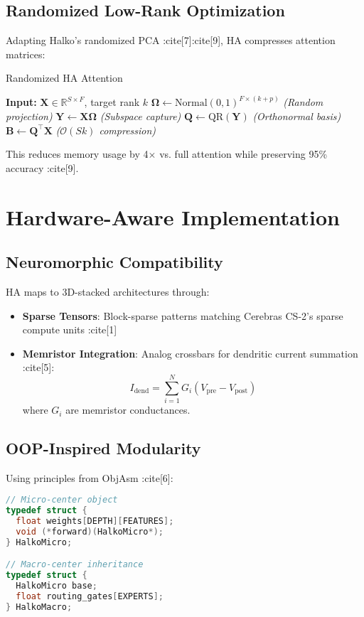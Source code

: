 \documentclass{article}
\begin{document}
\subsection{Randomized Low-Rank Optimization}
Adapting Halko's randomized PCA :cite[7]:cite[9], HA compresses attention matrices:
\begin{algorithm}[H]
\caption{Randomized HA Attention}
\begin{algorithmic}[1]
\State \textbf{Input:} $\mathbf{X} \in \mathbb{R}^{S \times F}$, target rank $k$
\State $\mathbf{\Omega} \gets \text{Normal}(0, 1)^{F \times (k+p)}$ \quad \textit{(Random projection)}
\State $\mathbf{Y} \gets \mathbf{X}\mathbf{\Omega}$ \quad \textit{(Subspace capture)}
\State $\mathbf{Q} \gets \text{QR}(\mathbf{Y})$ \quad \textit{(Orthonormal basis)}
\State $\mathbf{B} \gets \mathbf{Q}^\top \mathbf{X}$ \quad \textit{($\mathcal{O}(Sk)$ compression)}
\end{algorithmic}
\end{algorithm}

This reduces memory usage by 4$\times$ vs. full attention while preserving 95\% accuracy :cite[9].

\section{Hardware-Aware Implementation}
\label{sec:implementation}

\subsection{Neuromorphic Compatibility}
HA maps to 3D-stacked architectures through:
\begin{itemize}
\item \textbf{Sparse Tensors}: Block-sparse patterns matching Cerebras CS-2's sparse compute units :cite[1]
\item \textbf{Memristor Integration}: Analog crossbars for dendritic current summation :cite[5]:
\begin{equation}
I_{\text{dend}} = \sum_{i=1}^N G_i(V_{\text{pre}} - V_{\text{post}})
\end{equation}
where $G_i$ are memristor conductances.
\end{itemize}

\subsection{OOP-Inspired Modularity}
Using principles from ObjAsm :cite[6]:
\begin{lstlisting}[language=C]
// Micro-center object
typedef struct {
  float weights[DEPTH][FEATURES];
  void (*forward)(HalkoMicro*); 
} HalkoMicro;

// Macro-center inheritance
typedef struct {
  HalkoMicro base;
  float routing_gates[EXPERTS];
} HalkoMacro;
\end{lstlisting}
\end{document}
